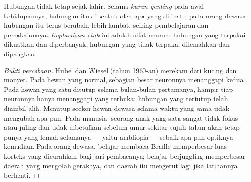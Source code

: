 \begin{proposition}[Keplastisan]\label{prop:g11:vision-and-brain:plasticity}
Hubungan  tidak tetap sejak lahir. Selama
\emph{kurun genting} pada awal kehidupannya, hubungan itu dibentuk oleh
apa yang dilihat ; pada orang dewasa hubungan itu terus berubah,
lebih lambat, seiring pembelajaran dan pemakaiannya. \emph{Keplastisan
otak} ini adalah sifat neuron: hubungan yang
terpakai dikuatkan dan diperbanyak, hubungan yang tidak terpakai
dilemahkan dan dipangkas.
\end{proposition}
\begin{proof}[Bukti percobaan]
Hubel dan Wiesel (tahun 1960-an) merekam dari 
kucing dan monyet. Pada hewan yang normal, sebagian besar neuronnya
menanggapi kedua . Pada hewan yang satu  ditutup selama
bulan-bulan pertamanya, hampir tiap neuronnya hanya menanggapi 
yang terbuka: hubungan  yang tertutup telah diambil alih. Menutup
 seekor hewan dewasa selama waktu yang sama tidak mengubah apa pun.
Pada manusia, seorang anak yang satu  sangat tidak fokus atau
juling dan tidak dibetulkan sebelum umur sekitar tujuh tahun akan tetap
punya  yang lemah selamanya --- yaitu ambliopia --- sebaik apa pun
optiknya kemudian. Pada orang dewasa, belajar membaca Braille
memperbesar luas korteks yang dicurahkan bagi jari pembacanya; belajar
berjuggling memperbesar daerah yang mengolah geraknya, dan daerah itu
mengerut lagi jika latihannya berhenti.
\end{proof}

